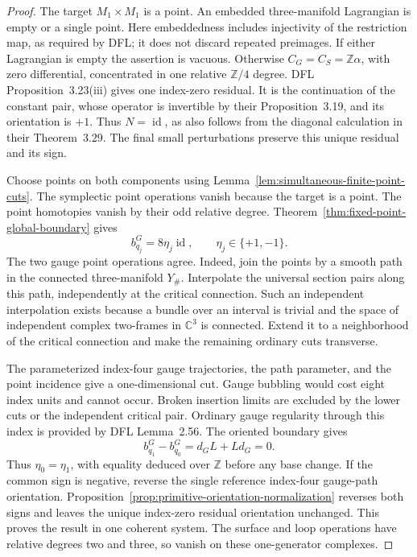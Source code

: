 \documentclass[11pt]{amsart}
\theoremstyle{definition}
\theoremstyle{remark}
\theoremstyle{plain}
\newcommand{\id}{\operatorname{id}}
\begin{document}
\begin{proof}
The target $M_1\times M_1$ is a point. An embedded
three-manifold Lagrangian is empty or a single point.
Here embeddedness includes injectivity of the
restriction map, as required by DFL; it does not
discard repeated preimages. If either Lagrangian
is empty the assertion is vacuous. Otherwise
$C_G=C_S=\mathbb Z\alpha$, with zero differential,
concentrated in one relative $\mathbb Z/4$ degree.
DFL Proposition~3.23(iii) gives one index-zero residual.
It is the continuation of the constant pair, whose
operator is invertible by their Proposition~3.19,
and its orientation is $+1$. Thus $N=\id$, as also
follows from the diagonal calculation in their
Theorem~3.29. The final small perturbations preserve
this unique residual and its sign.

Choose points on both components using
Lemma~\ref{lem:simultaneous-finite-point-cuts}.
The symplectic point operations vanish because
the target is a point. The point homotopies
vanish by their odd relative degree.
Theorem~\ref{thm:fixed-point-global-boundary} gives
\[
 b_{q_j}^G=8\eta_j\id,\qquad \eta_j\in\{+1,-1\}.
\]
The two gauge point operations agree. Indeed,
join the points by a smooth path in the connected
three-manifold $Y_\#$. Interpolate the universal
section pairs along this path, independently
at the critical connection. Such an independent
interpolation exists because a bundle over an
interval is trivial and the space of independent
complex two-frames in $\mathbb C^3$ is connected.
Extend it to a neighborhood of the critical
connection and make the remaining ordinary cuts
transverse.

The parameterized index-four gauge trajectories,
the path parameter, and the point incidence
give a one-dimensional cut. Gauge bubbling
would cost eight index units and cannot occur.
Broken insertion limits are excluded by the
lower cuts or the independent critical pair.
Ordinary gauge regularity through this index
is provided by DFL Lemma~2.56. The oriented
boundary gives
\[
             b_{q_1}^G-b_{q_0}^G=d_GL+Ld_G=0.
\]
Thus $\eta_0=\eta_1$, with equality deduced
over $\mathbb Z$ before any base change.
If the common sign is negative, reverse the
single reference index-four gauge-path orientation.
Proposition~\ref{prop:primitive-orientation-normalization}
reverses both signs and leaves the unique
index-zero residual orientation unchanged.
This proves the result in one coherent system.
The surface and loop operations have relative
degrees two and three, so vanish on these
one-generator complexes.
\end{proof}
\end{document}
